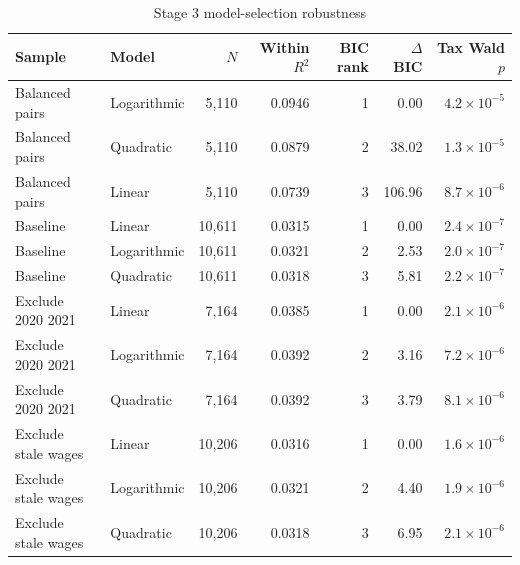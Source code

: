 \begin{table}[H]
\centering
\footnotesize
\setlength{\tabcolsep}{3pt}
\caption{Stage 3 model-selection robustness}
\label{tab:app_stage3_robustness}
\begin{tabular}{@{}llrrrrr@{}}
\toprule
Sample & Model & $N$ & Within $R^2$ & BIC rank & $\Delta$BIC & Tax Wald $p$ \\
\midrule
Balanced pairs & Logarithmic &  5,110 & 0.0946 & 1 &   0.00 & $4.2 \times 10^{-5}$ \\
Balanced pairs & Quadratic &  5,110 & 0.0879 & 2 &  38.02 & $1.3 \times 10^{-5}$ \\
Balanced pairs & Linear &  5,110 & 0.0739 & 3 & 106.96 & $8.7 \times 10^{-6}$ \\
Baseline & Linear & 10,611 & 0.0315 & 1 &   0.00 & $2.4 \times 10^{-7}$ \\
Baseline & Logarithmic & 10,611 & 0.0321 & 2 &   2.53 & $2.0 \times 10^{-7}$ \\
Baseline & Quadratic & 10,611 & 0.0318 & 3 &   5.81 & $2.2 \times 10^{-7}$ \\
Exclude 2020 2021 & Linear &  7,164 & 0.0385 & 1 &   0.00 & $2.1 \times 10^{-6}$ \\
Exclude 2020 2021 & Logarithmic &  7,164 & 0.0392 & 2 &   3.16 & $7.2 \times 10^{-6}$ \\
Exclude 2020 2021 & Quadratic &  7,164 & 0.0392 & 3 &   3.79 & $8.1 \times 10^{-6}$ \\
Exclude stale wages & Linear & 10,206 & 0.0316 & 1 &   0.00 & $1.6 \times 10^{-6}$ \\
Exclude stale wages & Logarithmic & 10,206 & 0.0321 & 2 &   4.40 & $1.9 \times 10^{-6}$ \\
Exclude stale wages & Quadratic & 10,206 & 0.0318 & 3 &   6.95 & $2.1 \times 10^{-6}$ \\
\bottomrule
\end{tabular}
\end{table}
